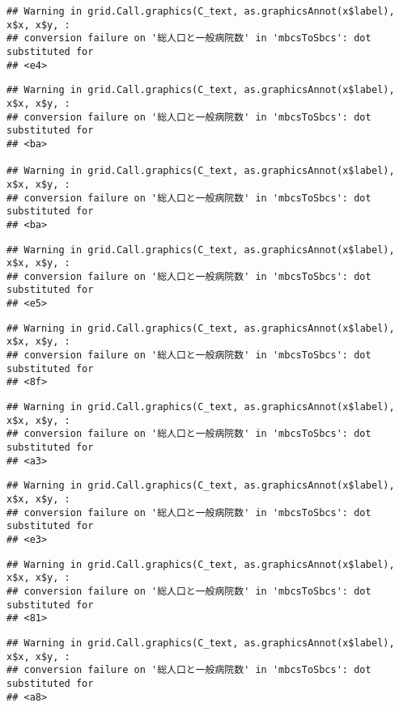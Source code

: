 \documentclass[
]{article}
\begin{document}
\begin{verbatim}
## Warning in grid.Call.graphics(C_text, as.graphicsAnnot(x$label), x$x, x$y, :
## conversion failure on '総人口と一般病院数' in 'mbcsToSbcs': dot substituted for
## <e4>
\end{verbatim}

\begin{verbatim}
## Warning in grid.Call.graphics(C_text, as.graphicsAnnot(x$label), x$x, x$y, :
## conversion failure on '総人口と一般病院数' in 'mbcsToSbcs': dot substituted for
## <ba>

## Warning in grid.Call.graphics(C_text, as.graphicsAnnot(x$label), x$x, x$y, :
## conversion failure on '総人口と一般病院数' in 'mbcsToSbcs': dot substituted for
## <ba>
\end{verbatim}

\begin{verbatim}
## Warning in grid.Call.graphics(C_text, as.graphicsAnnot(x$label), x$x, x$y, :
## conversion failure on '総人口と一般病院数' in 'mbcsToSbcs': dot substituted for
## <e5>
\end{verbatim}

\begin{verbatim}
## Warning in grid.Call.graphics(C_text, as.graphicsAnnot(x$label), x$x, x$y, :
## conversion failure on '総人口と一般病院数' in 'mbcsToSbcs': dot substituted for
## <8f>
\end{verbatim}

\begin{verbatim}
## Warning in grid.Call.graphics(C_text, as.graphicsAnnot(x$label), x$x, x$y, :
## conversion failure on '総人口と一般病院数' in 'mbcsToSbcs': dot substituted for
## <a3>
\end{verbatim}

\begin{verbatim}
## Warning in grid.Call.graphics(C_text, as.graphicsAnnot(x$label), x$x, x$y, :
## conversion failure on '総人口と一般病院数' in 'mbcsToSbcs': dot substituted for
## <e3>
\end{verbatim}

\begin{verbatim}
## Warning in grid.Call.graphics(C_text, as.graphicsAnnot(x$label), x$x, x$y, :
## conversion failure on '総人口と一般病院数' in 'mbcsToSbcs': dot substituted for
## <81>
\end{verbatim}

\begin{verbatim}
## Warning in grid.Call.graphics(C_text, as.graphicsAnnot(x$label), x$x, x$y, :
## conversion failure on '総人口と一般病院数' in 'mbcsToSbcs': dot substituted for
## <a8>
\end{verbatim}
\end{document}
